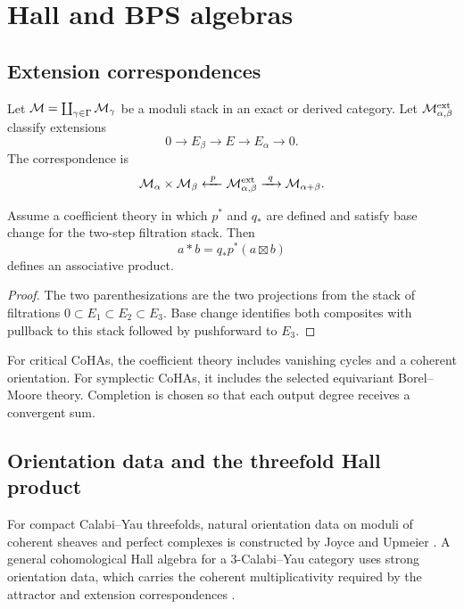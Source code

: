 \part{Hall and BPS algebras}

\chapter{Extension correspondences}
Let $\mathcal M=\coprod_{\gamma\in\Gamma}\mathcal M_\gamma$ be a moduli stack in an exact or derived category. Let $\mathcal M^{\mathrm{ext}}_{\alpha,\beta}$ classify extensions
\[
 0\longrightarrow E_\beta\longrightarrow E\longrightarrow E_\alpha\longrightarrow0.
\]
The correspondence is
\[
 \mathcal M_\alpha\times\mathcal M_\beta
 \xleftarrow{\ p\ }
 \mathcal M^{\mathrm{ext}}_{\alpha,\beta}
 \xrightarrow{\ q\ }
 \mathcal M_{\alpha+\beta}.
\]

\begin{theorem}
Assume a coefficient theory in which $p^*$ and $q_*$ are defined and satisfy base change for the two-step filtration stack. Then
\[
 a*b=q_*p^*(a\boxtimes b)
\]
defines an associative product.
\end{theorem}
\begin{proof}
The two parenthesizations are the two projections from the stack of filtrations $0\subset E_1\subset E_2\subset E_3$. Base change identifies both composites with pullback to this stack followed by pushforward to $E_3$.
\end{proof}

For critical CoHAs, the coefficient theory includes vanishing cycles and a coherent orientation. For symplectic CoHAs, it includes the selected equivariant Borel--Moore theory. Completion is chosen so that each output degree receives a convergent sum.

\chapter{Orientation data and the threefold Hall product}
For compact Calabi--Yau threefolds, natural orientation data on moduli of coherent sheaves and perfect complexes is constructed by Joyce and Upmeier \cite{JoyceUpmeier}.  A general cohomological Hall algebra for a $3$-Calabi--Yau category uses strong orientation data, which carries the coherent multiplicativity required by the attractor and extension correspondences \cite{KPS}.

